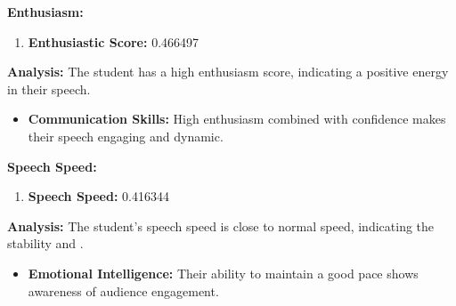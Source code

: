 \documentclass{article}
\begin{document}
    \large{\textbf{Enthusiasm:}}
    \begin{tcolorbox}[colback=orange!10!white, colframe=orange!80!black, title=Enthusiastic Score]
        \begin{enumerate}
            \item \textbf{Enthusiastic Score:} \textcolor{orange!70!black}{0.466497}
        \end{enumerate}
        \textbf{Analysis:} The student has a high enthusiasm score, indicating a positive energy in their speech.
        \begin{itemize}
            \item \textbf{Communication Skills:} High enthusiasm combined with confidence makes their speech engaging and dynamic.
        \end{itemize}
    \end{tcolorbox}

    \large{\textbf{Speech Speed:}}
    \begin{tcolorbox}[colback=purple!10!white, colframe=purple!80!black, title=Speech Speed]
        \begin{enumerate}
            \item \textbf{Speech Speed:} \textcolor{purple!70!black}{0.416344}
        \end{enumerate}
        \textbf{Analysis:} The student's speech speed is close to normal speed, indicating the stability and .
        \begin{itemize}
            \item \textbf{Emotional Intelligence:} Their ability to maintain a good pace shows awareness of audience engagement.
        \end{itemize}
    \end{tcolorbox}
\end{document}
